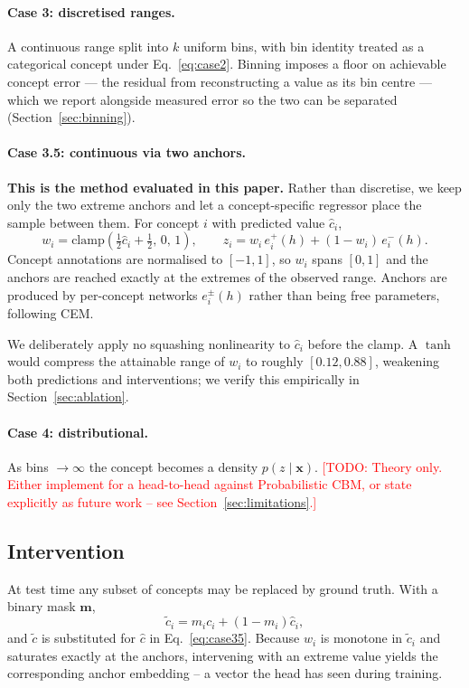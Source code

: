 \documentclass[11pt]{article}
\newcommand{\todo}[1]{\textcolor{red}{[TODO: #1]}}
\newcommand{\xvec}{\mathbf{x}}
\begin{document}
\paragraph{Case 3: discretised ranges.}
A continuous range split into $k$ uniform bins, with bin identity treated as a
categorical concept under Eq.~\ref{eq:case2}. Binning imposes a floor on
achievable concept error --- the residual from reconstructing a value as its
bin centre --- which we report alongside measured error so the two can be
separated (Section~\ref{sec:binning}).

\paragraph{Case 3.5: continuous via two anchors.}
\textbf{This is the method evaluated in this paper.} Rather than discretise, we
keep only the two extreme anchors and let a concept-specific regressor place
the sample between them. For concept $i$ with predicted value $\hat{c}_i$,
\begin{equation}
  w_i = \mathrm{clamp}\!\left(\tfrac{1}{2}\hat{c}_i + \tfrac{1}{2},\, 0,\, 1\right),
  \qquad
  z_i = w_i\, e_i^{+}(h) + (1 - w_i)\, e_i^{-}(h).
  \label{eq:case35}
\end{equation}
Concept annotations are normalised to $[-1, 1]$, so $w_i$ spans $[0,1]$ and the
anchors are reached exactly at the extremes of the observed range. Anchors are
produced by per-concept networks $e_i^{\pm}(h)$ rather than being free
parameters, following CEM.

We deliberately apply no squashing nonlinearity to $\hat{c}_i$ before the clamp.
A $\tanh$ would compress the attainable range of $w_i$ to roughly
$[0.12, 0.88]$, weakening both predictions and interventions; we verify this
empirically in Section~\ref{sec:ablation}.

\paragraph{Case 4: distributional.}
As bins $\to \infty$ the concept becomes a density $p(z \mid \xvec)$.
\todo{Theory only. Either implement for a head-to-head against Probabilistic
CBM, or state explicitly as future work -- see Section~\ref{sec:limitations}.}

\subsection{Intervention}
At test time any subset of concepts may be replaced by ground truth. With a
binary mask $\mathbf{m}$,
\begin{equation}
  \tilde{c}_i = m_i c_i + (1 - m_i)\hat{c}_i,
\end{equation}
and $\tilde{c}$ is substituted for $\hat{c}$ in Eq.~\ref{eq:case35}. Because
$w_i$ is monotone in $\tilde{c}_i$ and saturates exactly at the anchors,
intervening with an extreme value yields the corresponding anchor embedding --
a vector the head has seen during training.
\end{document}
